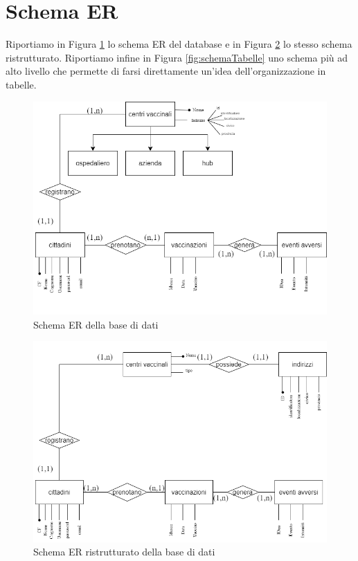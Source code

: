 \section{Schema ER}

	Riportiamo in Figura \ref{fig:schemaER} lo schema ER del database e in Figura \ref{fig:schemaER-ristr} lo stesso schema ristrutturato.	
	Riportiamo infine in Figura \ref{fig:schemaTabelle} uno schema più ad alto livello che permette di farsi direttamente un'idea dell'organizzazione in tabelle.
	
\begin{figure}[h]
	\includegraphics[width=\textwidth]{./img/ER}
	\caption{Schema ER della base di dati}
	\label{fig:schemaER}
\end{figure}

\begin{figure}[h]
	\includegraphics[width=\textwidth]{./img/ER-ristr}
	\caption{Schema ER ristrutturato della base di dati}
	\label{fig:schemaER-ristr}
\end{figure}

